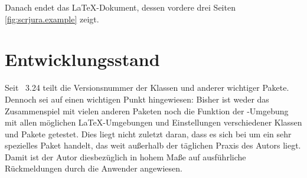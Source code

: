 %
Danach endet das \LaTeX-Dokument, dessen vordere drei Seiten
\autoref{fig:scrjura.example} zeigt.%
%
\begin{figure}
  \setcapindent{0pt}%
  \label{fig:scrjura.example}
\end{figure}


\section{Entwicklungsstand}

Seit \KOMAScript~3.24 teilt  die Versionsnummer der Klassen
und anderer wichtiger Pakete. Dennoch sei auf einen wichtigen Punkt
hingewiesen: Bisher ist weder das Zusammenspiel mit vielen anderen Paketen
noch die Funktion der -Umgebung mit allen
möglichen \LaTeX-Umgebungen und Einstellungen verschiedener Klassen und Pakete
getestet. Dies liegt nicht zuletzt daran, dass es sich bei 
um ein sehr spezielles Paket handelt, das weit außerhalb der täglichen Praxis
des Autors liegt. Damit ist der Autor diesbezüglich in hohem Maße auf
ausführliche Rückmeldungen durch die Anwender angewiesen.%
\EndIndexGroup


